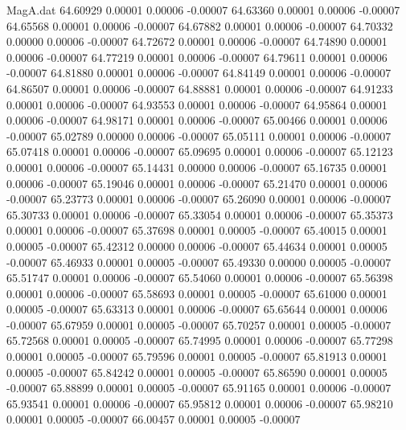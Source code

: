 \begin{filecontents}{MagA.dat}
  64.60929    0.00001    0.00006   -0.00007
  64.63360    0.00001    0.00006   -0.00007
  64.65568    0.00001    0.00006   -0.00007
  64.67882    0.00001    0.00006   -0.00007
  64.70332    0.00000    0.00006   -0.00007
  64.72672    0.00001    0.00006   -0.00007
  64.74890    0.00001    0.00006   -0.00007
  64.77219    0.00001    0.00006   -0.00007
  64.79611    0.00001    0.00006   -0.00007
  64.81880    0.00001    0.00006   -0.00007
  64.84149    0.00001    0.00006   -0.00007
  64.86507    0.00001    0.00006   -0.00007
  64.88881    0.00001    0.00006   -0.00007
  64.91233    0.00001    0.00006   -0.00007
  64.93553    0.00001    0.00006   -0.00007
  64.95864    0.00001    0.00006   -0.00007
  64.98171    0.00001    0.00006   -0.00007
  65.00466    0.00001    0.00006   -0.00007
  65.02789    0.00000    0.00006   -0.00007
  65.05111    0.00001    0.00006   -0.00007
  65.07418    0.00001    0.00006   -0.00007
  65.09695    0.00001    0.00006   -0.00007
  65.12123    0.00001    0.00006   -0.00007
  65.14431    0.00000    0.00006   -0.00007
  65.16735    0.00001    0.00006   -0.00007
  65.19046    0.00001    0.00006   -0.00007
  65.21470    0.00001    0.00006   -0.00007
  65.23773    0.00001    0.00006   -0.00007
  65.26090    0.00001    0.00006   -0.00007
  65.30733    0.00001    0.00006   -0.00007
  65.33054    0.00001    0.00006   -0.00007
  65.35373    0.00001    0.00006   -0.00007
  65.37698    0.00001    0.00005   -0.00007
  65.40015    0.00001    0.00005   -0.00007
  65.42312    0.00000    0.00006   -0.00007
  65.44634    0.00001    0.00005   -0.00007
  65.46933    0.00001    0.00005   -0.00007
  65.49330    0.00000    0.00005   -0.00007
  65.51747    0.00001    0.00006   -0.00007
  65.54060    0.00001    0.00006   -0.00007
  65.56398    0.00001    0.00006   -0.00007
  65.58693    0.00001    0.00005   -0.00007
  65.61000    0.00001    0.00005   -0.00007
  65.63313    0.00001    0.00006   -0.00007
  65.65644    0.00001    0.00006   -0.00007
  65.67959    0.00001    0.00005   -0.00007
  65.70257    0.00001    0.00005   -0.00007
  65.72568    0.00001    0.00005   -0.00007
  65.74995    0.00001    0.00006   -0.00007
  65.77298    0.00001    0.00005   -0.00007
  65.79596    0.00001    0.00005   -0.00007
  65.81913    0.00001    0.00005   -0.00007
  65.84242    0.00001    0.00005   -0.00007
  65.86590    0.00001    0.00005   -0.00007
  65.88899    0.00001    0.00005   -0.00007
  65.91165    0.00001    0.00006   -0.00007
  65.93541    0.00001    0.00006   -0.00007
  65.95812    0.00001    0.00006   -0.00007
  65.98210    0.00001    0.00005   -0.00007
  66.00457    0.00001    0.00005   -0.00007

\end{filecontents}
